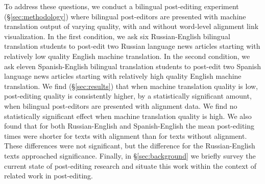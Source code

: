 To address these questions, we conduct a bilingual post-editing experiment (\S\ref{sec:methodology}) where bilingual post-editors are presented with machine translation output of varying quality, with and without word-level alignment link visualization.
%
In the first condition, we ask six Russian-English bilingual translation students to post-edit two Russian language news articles starting with relatively low quality English machine translation.
%
In the second condition, we ask eleven Spanish-English bilingual translation students to post-edit two Spanish language news articles starting with relatively high quality English machine translation.
%
We find (\S\ref{sec:results}) that when machine translation quality is low, post-editing quality is consistently higher, by a statistically significant amount, when bilingual post-editors are presented with alignment data.
%
We find no statistically significant effect when machine translation quality is high.
%
We also found that for both Russian-English and Spanish-English the mean post-editing times were shorter for texts with alignment than for texts without alignment. These differences were not significant, but the difference for the Russian-English texts approached significance. 
%
Finally, in \S\ref{sec:background} we briefly survey the current state of post-editing research and situate this work within the context of related work in post-editing.